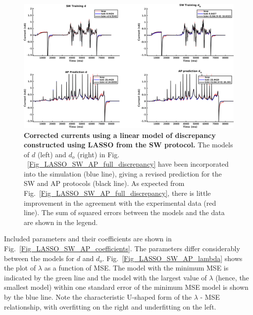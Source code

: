 \documentclass[11pt,a4paper,oneside]{article}
\begin{document}
{\begin{figure}[hbt]
\begin{center}
\includegraphics[scale=0.42]{Figures/LASSO_SW_AP_full_currents.png}
\caption{\textbf{Corrected currents using a linear model of discrepancy constructed using LASSO from the SW protocol.} The models of $d$ (left) and $d_o$ (right) in Fig. ~\ref{Fig_LASSO_SW_AP_full_discrepancy} have been incorporated into the simulation (blue line), giving a revised prediction for the SW and AP protocols (black line). As expected from Fig.~\ref{Fig_LASSO_SW_AP_full_discrepancy}, there is little improvement in the agreement with the experimental data (red line). The sum of squared errors between the models and the data are shown in the legend.}
\label{Fig_LASSO_SW_AP_full_currents}
\end{center}
\end{figure}

Included parameters and their coefficients are shown in Fig.~\ref{Fig_LASSO_SW_AP_coefficients}. The parameters differ considerably between the models for $d$ and $d_o$. Fig.~\ref{Fig_LASSO_SW_AP_lambda} shows the plot of $\lambda$ as a function of MSE. The model with the minimum MSE is indicated by the green line and the model with the largest value of $\lambda$ (hence, the smallest model) within one standard error of the minimum MSE model is shown by the blue line. Note the characteristic U-shaped form of the $\lambda$ - MSE relationship, with overfitting on the right and underfitting on the left.

}
\end{document}

